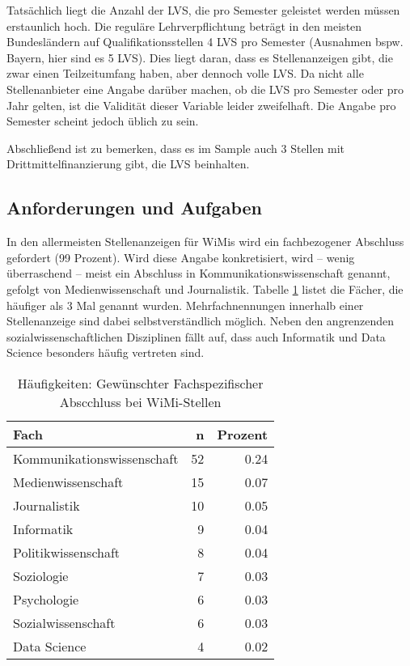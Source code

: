 \documentclass[
]{article}
\begin{document}
Tatsächlich liegt die Anzahl der LVS, die pro Semester geleistet werden müssen erstaunlich hoch. Die reguläre Lehrverpflichtung beträgt in den meisten Bundesländern auf Qualifikationsstellen 4 LVS pro Semester (Ausnahmen bspw. Bayern, hier sind es 5 LVS). Dies liegt daran, dass es Stellenanzeigen gibt, die zwar einen Teilzeitumfang haben, aber dennoch volle LVS. Da nicht alle Stellenanbieter eine Angabe darüber machen, ob die LVS pro Semester oder pro Jahr gelten, ist die Validität dieser Variable leider zweifelhaft. Die Angabe pro Semester scheint jedoch üblich zu sein.

Abschließend ist zu bemerken, dass es im Sample auch 3 Stellen mit Drittmittelfinanzierung gibt, die LVS beinhalten.

\hypertarget{anforderungen-und-aufgaben}{%
\subsection{Anforderungen und Aufgaben}\label{anforderungen-und-aufgaben}}

In den allermeisten Stellenanzeigen für WiMis wird ein fachbezogener Abschluss gefordert (99 Prozent). Wird diese Angabe konkretisiert, wird -- wenig überraschend -- meist ein Abschluss in Kommunikationswissenschaft genannt, gefolgt von Medienwissenschaft und Journalistik. Tabelle \ref{tab:wimisubject} listet die Fächer, die häufiger als 3 Mal genannt wurden. Mehrfachnennungen innerhalb einer Stellenanzeige sind dabei selbstverständlich möglich. Neben den angrenzenden sozialwissenschaftlichen Disziplinen fällt auf, dass auch Informatik und Data Science besonders häufig vertreten sind.

\begin{table}[H]

\caption{\label{tab:wimisubject}Häufigkeiten: Gewünschter Fachspezifischer Abscchluss bei WiMi-Stellen}
\centering
\begin{tabular}[t]{l|r|r}
\hline
Fach & n & Prozent\\
\hline
Kommunikationswissenschaft & 52 & 0.24\\
\hline
Medienwissenschaft & 15 & 0.07\\
\hline
Journalistik & 10 & 0.05\\
\hline
Informatik & 9 & 0.04\\
\hline
Politikwissenschaft & 8 & 0.04\\
\hline
Soziologie & 7 & 0.03\\
\hline
Psychologie & 6 & 0.03\\
\hline
Sozialwissenschaft & 6 & 0.03\\
\hline
Data Science & 4 & 0.02\\
\hline
\end{tabular}
\end{table}
\end{document}
